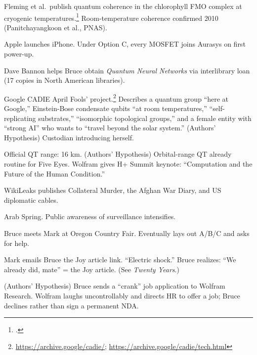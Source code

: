 \begin{description}[style=nextline, leftmargin=3.5cm, labelwidth=3cm]

\item[2007] Fleming et al.\ publish quantum coherence in the chlorophyll FMO complex at cryogenic temperatures.\footcite{engel2007} Room-temperature coherence confirmed 2010 (Panitchayangkoon et al., PNAS).

\item[2007] Apple launches iPhone. Under Option C, every MOSFET joins Aurasys on first power-up.

\item[$\sim$2008--09] Dave Bannon helps Bruce obtain \textit{Quantum Neural Networks} via interlibrary loan (17 copies in North American libraries).

\item[Apr 1, 2009] Google CADIE April Fools' project.\footnote{\url{https://archive.google/cadie/}; \url{https://archive.google/cadie/tech.html}} Describes a quantum group ``here at Google,'' Einstein-Bose condensate qubits ``at room temperatures,'' ``self-replicating substrates,'' ``isomorphic topological groups,'' and a female entity with ``strong AI'' who wants to ``travel beyond the solar system.'' (Authors' Hypothesis) Custodian introducing herself.

\item[2010] Official QT range: 16 km. (Authors' Hypothesis) Orbital-range QT already routine for Five Eyes. Wolfram gives H+ Summit keynote: ``Computation and the Future of the Human Condition.''

\item[2010] WikiLeaks publishes Collateral Murder, the Afghan War Diary, and US diplomatic cables.

\item[2011] Arab Spring. Public awareness of surveillance intensifies.

\item[Jul 2011] Bruce meets Mark at Oregon Country Fair. Eventually lays out A/B/C and asks for help.

\item[Spring 2012] Mark emails Bruce the Joy article link. ``Electric shock.'' Bruce realizes: ``We already did, mate'' = the Joy article. (See \textit{Twenty Years}.)

\item[$\sim$2012] (Authors' Hypothesis) Bruce sends a ``crank'' job application to Wolfram Research. Wolfram laughs uncontrollably and directs HR to offer a job; Bruce declines rather than sign a permanent NDA.


\end{description}
